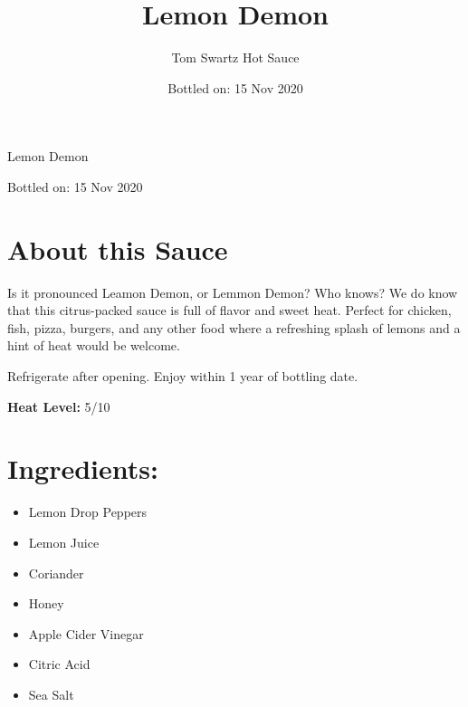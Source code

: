 \documentclass[12pt]{article}
\title{Lemon Demon}
\author{Tom Swartz Hot Sauce}
\date{Bottled on: 15 Nov 2020}
\begin{document}
\begin{center}
{\Huge Lemon Demon}
\par
{\Large Bottled on: 15 Nov 2020}
\vfill
\begin{minipage}{0.45\textwidth}
\Large
\section*{About this Sauce \color{black}\hrulefill\color{black}}
Is it pronounced Leamon Demon, or Lemmon Demon? Who knows?
We do know that this citrus-packed sauce is full of flavor and sweet heat.
Perfect for chicken, fish, pizza, burgers, and any other food where a refreshing
splash of lemons and a hint of heat would be welcome.
\par
Refrigerate after opening.
Enjoy within 1 year of bottling date.
\begin{center}
        {\LARGE
        \textbf{Heat Level:} 5/10
        }
\end{center}
\end{minipage}
\hfill
\begin{minipage}{0.45\textwidth}
\vspace{-0.4cm}
\Large
\section*{\hspace{0.5cm}Ingredients: \color{black}\hrulefill\color{black}}
\begin{itemize}
        \item Lemon Drop Peppers
        \item Lemon Juice
        \item Coriander
        \item Honey
        \item Apple Cider Vinegar
        \item Citric Acid
        \item Sea Salt
\end{itemize}
\end{minipage}
\end{center}
\end{document}

